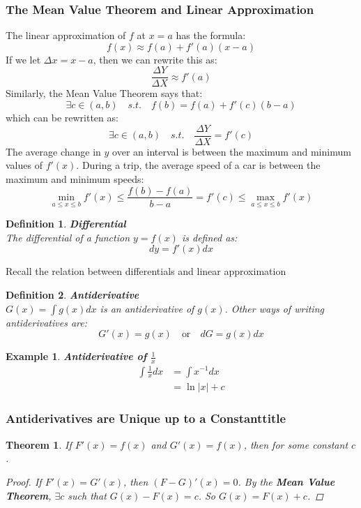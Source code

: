 \documentclass[10pt, a4paper]{article}
\newtheorem{theorem}{Theorem}
\newtheorem{definition}{Definition}
\newtheorem{example}{Example}
\begin{document}
\subsubsection*{The Mean Value Theorem and Linear Approximation}
The linear approximation of $f$ at $x = a$ has the formula:
\[f(x)\approx f(a)+f'(a)(x-a)\]
If we let $\Delta x = x - a$, then we can rewrite this as:
\[\frac{\Delta Y}{\Delta X} \approx f'(a)\]
Similarly, the Mean Value Theorem says that:
\[\exists c \in (a, b) \quad s.t. \quad f(b) = f(a) + f'(c)(b - a)\]
which can be rewritten as:
\[\exists c \in (a, b) \quad s.t. \quad \frac{\Delta Y}{\Delta X} = f'(c)\]
The average change in $y$ over an interval is between the maximum and minimum values of $f'(x)$. 
During a trip, the average speed of a car is between the maximum and minimum speeds:
\[\min_{a\leq x\leq b}f'(x)\leq\frac{f(b)-f(a)}{b-a}=f'(c)\leq\max_{a\leq x\leq b}f'(x)\]

\begin{definition}
    \textbf{Differential} \\
    The differential of a function $y = f(x)$ is defined as:
    \[dy = f'(x)dx\]
\end{definition}
\ast  Recall the relation between differentials and linear approximation

\begin{definition}
    \textbf{Antiderivative} \\
    $G(x) = \int g(x)dx$ is an antiderivative of $g(x)$. Other ways of writing antiderivatives are:
    \[G'(x) = g(x)\quad\text{or}\quad dG = g(x)dx\]
\end{definition}

\begin{example}
    \textbf{Antiderivative of $\frac{1}{x}$}
    \begin{align*}
        \int\frac{1}{x}dx &= \int x^{-1}dx \\
        &= \ln|x| + c
    \end{align*}
\end{example}

\subsubsection*{Antiderivatives are Unique up to a Constanttitle}
\begin{theorem}
    If $F'(x) = f(x)$ and $G'(x) = f(x)$, then  for some constant $c$.
    \begin{proof}
        If $F'(x) = G'(x)$, then $(F - G)'(x) = 0$. By the \textbf{Mean Value Theorem}, $\exists c$ such that
        $G(x) - F(x) = c$. So $G(x) = F(x) + c$.
    \end{proof}  
\end{theorem}
\end{document}
